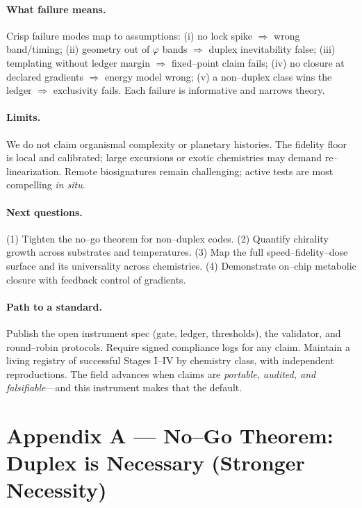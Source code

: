 \documentclass[11pt]{article}
\begin{document}
\paragraph{What failure means.}
Crisp failure modes map to assumptions: (i) no lock spike $\Rightarrow$ wrong band/timing; (ii) geometry out of $\varphi$ bands $\Rightarrow$ duplex inevitability false; (iii) templating without ledger margin $\Rightarrow$ fixed–point claim fails; (iv) no closure at declared gradients $\Rightarrow$ energy model wrong; (v) a non–duplex class wins the ledger $\Rightarrow$ exclusivity fails. Each failure is informative and narrows theory.

\paragraph{Limits.}
We do not claim organismal complexity or planetary histories. The fidelity floor is local and calibrated; large excursions or exotic chemistries may demand re–linearization. Remote biosignatures remain challenging; active tests are most compelling \emph{in situ}.

\paragraph{Next questions.}
(1) Tighten the no–go theorem for non–duplex codes. (2) Quantify chirality growth across substrates and temperatures. (3) Map the full speed–fidelity–dose surface and its universality across chemistries. (4) Demonstrate on–chip metabolic closure with feedback control of gradients.

\paragraph{Path to a standard.}
Publish the open instrument spec (gate, ledger, thresholds), the validator, and round–robin protocols. Require signed compliance logs for any claim. Maintain a living registry of successful Stages I–IV by chemistry class, with independent reproductions. The field advances when claims are \emph{portable, audited, and falsifiable}—and this instrument makes that the default.

\appendix

\section*{Appendix A — No–Go Theorem: Duplex is Necessary (Stronger Necessity)}\label{app:nogo}
\end{document}
